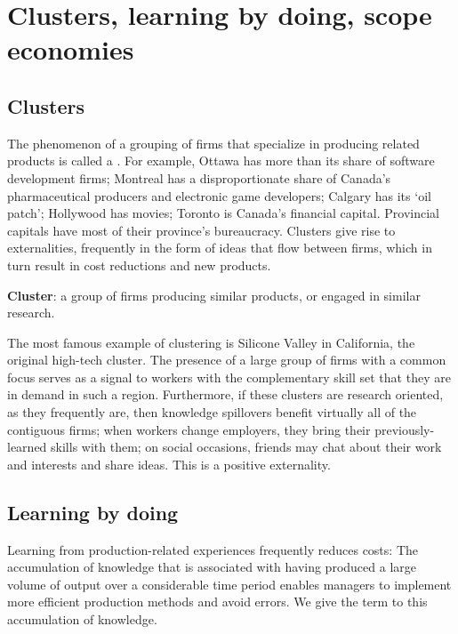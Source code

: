 \section{Clusters, learning by doing, scope economies}\label{sec:ch8sec8}
 
\subsection*{Clusters}

The phenomenon of a grouping of firms that specialize in producing related products is called a . For example, Ottawa has more than its share of software development firms; Montreal has a disproportionate share of Canada's pharmaceutical producers and electronic game developers; Calgary has its `oil patch'; Hollywood has movies; Toronto is Canada's financial capital. Provincial capitals have most of their province's bureaucracy. Clusters give rise to externalities, frequently in the form of ideas that flow between firms, which in turn result in cost reductions and new products.

\begin{DefBox}
\textbf{Cluster}: a group of firms producing similar products, or engaged in similar research.
\end{DefBox}

The most famous example of clustering is Silicone Valley in California, the original high-tech cluster. The presence of a large group of firms with a common focus serves as a signal to workers with the complementary skill set that they are in demand in such a region. Furthermore, if these clusters are research oriented, as they frequently are, then knowledge spillovers benefit virtually all of the contiguous firms; when workers change employers, they bring their previously-learned skills with them; on social occasions, friends may chat about their work and interests and share ideas. This is a positive externality.

\subsection*{Learning by doing}

Learning from production-related experiences frequently reduces costs: The accumulation of knowledge that is associated with having produced a large volume of output over a considerable time period enables managers to implement more efficient production methods and avoid errors. We give the term  to this accumulation of knowledge. 

